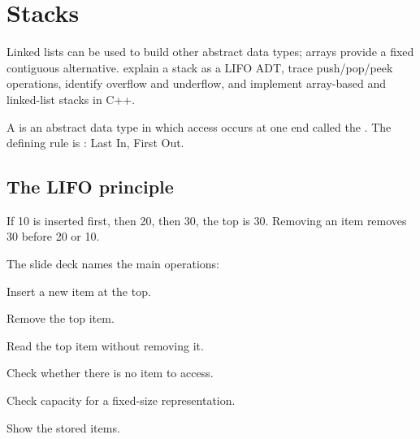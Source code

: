 \chapter{Stacks}
\label{ch:stacks}

\chapterguide%
  {Linked lists can be used to build other abstract data types; arrays provide a fixed contiguous alternative.}
  {explain a stack as a LIFO ADT, trace push/pop/peek operations, identify overflow and underflow, and implement array-based and linked-list stacks in C++.}

A  is an abstract data type in which access occurs at one end called the . The defining rule is : Last In, First Out.

\section{The LIFO principle}

If 10 is inserted first, then 20, then 30, the top is 30. Removing an item removes 30 before 20 or 10.

\begin{mlfigure}
\end{mlfigure}

The slide deck names the main operations:

\begin{description}[leftmargin=1.2in,style=nextline]
  \item[push()] Insert a new item at the top.
  \item[pop()] Remove the top item.
  \item[peek()] Read the top item without removing it.
  \item[isEmpty()] Check whether there is no item to access.
  \item[isFull()] Check capacity for a fixed-size representation.
  \item[display()] Show the stored items.
\end{description}


